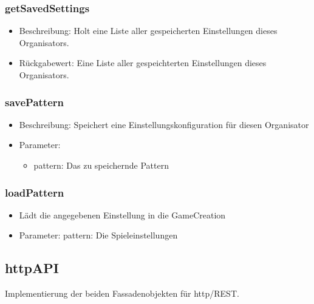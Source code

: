 \documentclass[a4paper]{scrreprt}
\begin{document}
    \subsubsection{getSavedSettings}
    \begin{itemize}
        \item Beschreibung: Holt eine Liste aller gespeicherten Einstellungen dieses Organisators.
        \item Rückgabewert: Eine Liste aller gespeichterten Einstellungen dieses Organisators.
    \end{itemize}
    \subsubsection{savePattern}
    \begin{itemize}
        \item Beschreibung: Speichert eine Einstellungskonfiguration für diesen Organisator
        \item Parameter:
        \begin{itemize}
            \item pattern: Das zu speichernde Pattern
        \end{itemize}
    \end{itemize}

    \subsubsection{loadPattern}
    \begin{itemize}
        \item Lädt die angegebenen Einstellung in die GameCreation
        \item Parameter: pattern: Die Spieleinstellungen
    \end{itemize}


    \subsection{httpAPI}
    Implementierung der beiden Fassadenobjekten für http/REST.
\end{document}
